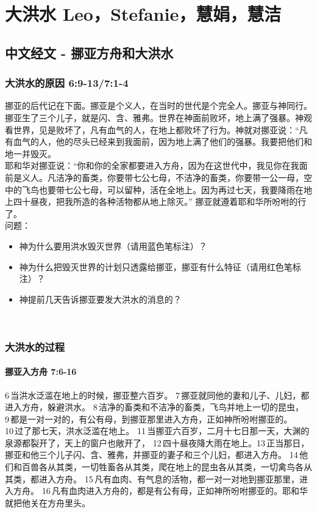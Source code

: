 \chapter{大洪水 Leo，Stefanie，慧娟，慧洁}

\section{中文经文 - 挪亚方舟和大洪水}
\subsection{大洪水的原因 6:9-13/7:1-4}

挪亚的后代记在下面。挪亚是个义人，在当时的世代是个完全人。挪亚与神同行。挪亚生了三个儿子，就是闪、含、雅弗。世界在神面前败坏，地上满了强暴。神观看世界，见是败坏了，凡有血气的人，在地上都败坏了行为。神就对挪亚说：“凡有血气的人，他的尽头已经来到我面前，因为地上满了他们的强暴。我要把他们和地一并毁灭。\\

耶和华对挪亚说：“你和你的全家都要进入方舟，因为在这世代中，我见你在我面前是义人。凡洁净的畜类，你要带七公七母，不洁净的畜类，你要带一公一母，空中的飞鸟也要带七公七母，可以留种，活在全地上。因为再过七天，我要降雨在地上四十昼夜，把我所造的各种活物都从地上除灭。” 挪亚就遵着耶和华所吩咐的行了。\\

问题：
\begin{itemize}
\item 神为什么要用洪水毁灭世界（请用蓝色笔标注）？
\item 神为什么把毁灭世界的计划只透露给挪亚，挪亚有什么特征（请用红色笔标注）？
\item 神提前几天告诉挪亚要发大洪水的消息的？
\end{itemize}
\\

\subsection{大洪水的过程}
\subsubsection{挪亚入方舟 7:6-16}
6 当洪水泛滥在地上的时候，挪亚整六百岁。 7 挪亚就同他的妻和儿子、儿妇，都进入方舟，躲避洪水。 8 洁净的畜类和不洁净的畜类，飞鸟并地上一切的昆虫， 9 都是一对一对的，有公有母，到挪亚那里进入方舟，正如神所吩咐挪亚的。 10 过了那七天，洪水泛滥在地上。 11 当挪亚六百岁，二月十七日那一天，大渊的泉源都裂开了，天上的窗户也敞开了， 12 四十昼夜降大雨在地上。13 正当那日，挪亚和他三个儿子闪、含、雅弗，并挪亚的妻子和三个儿妇，都进入方舟。 14 他们和百兽各从其类，一切牲畜各从其类，爬在地上的昆虫各从其类，一切禽鸟各从其类，都进入方舟。 15 凡有血肉、有气息的活物，都一对一对地到挪亚那里，进入方舟。 16 凡有血肉进入方舟的，都是有公有母，正如神所吩咐挪亚的。耶和华就把他关在方舟里头。\\

